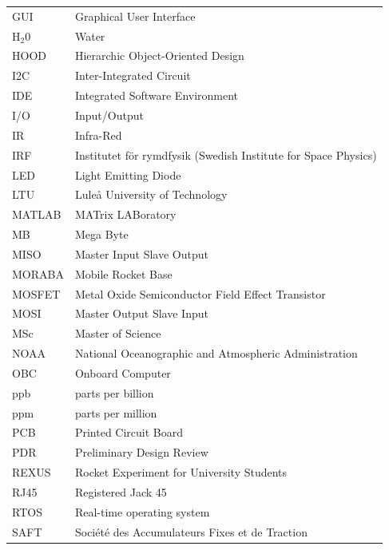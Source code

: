 \documentclass[a4paper,12pt,oneside]{article}
\begin{document}
\begin{longtable}{p{3cm} p{9cm}}
            GUI         & Graphical User Interface\\
            H$_2$0      & Water \\
            HOOD        & Hierarchic Object-Oriented Design\\
            I2C         & Inter-Integrated Circuit \\
            IDE         & Integrated Software Environment \\
            I/O         & Input/Output\\
            IR          & Infra-Red\\
            IRF         & Institutet för rymdfysik (Swedish Institute for Space Physics)\\
            LED         & Light Emitting Diode\\
            LTU         & Luleå University of Technology \\
            MATLAB      & MATrix LABoratory\\
            MB          & Mega Byte\\
            MISO        & Master Input Slave Output\\
            MORABA      & Mobile Rocket Base \\
            MOSFET      & Metal Oxide Semiconductor Field Effect Transistor\\
            MOSI        & Master Output Slave Input\\
            MSc         & Master of Science \\
            NOAA        & National Oceanographic and Atmospheric Administration \\
            OBC         & Onboard Computer\\
            ppb         & parts per billion\\
            ppm         & parts per million\\
            PCB         & Printed Circuit Board\\
            PDR         & Preliminary Design Review\\
            REXUS       & Rocket Experiment for University Students \\
            RJ45        & Registered Jack 45 \\
            RTOS        & Real-time operating system\\
            SAFT        & Soci\'{e}t\'{e} des Accumulateurs Fixes et de Traction\\

\end{longtable}
\end{document}
